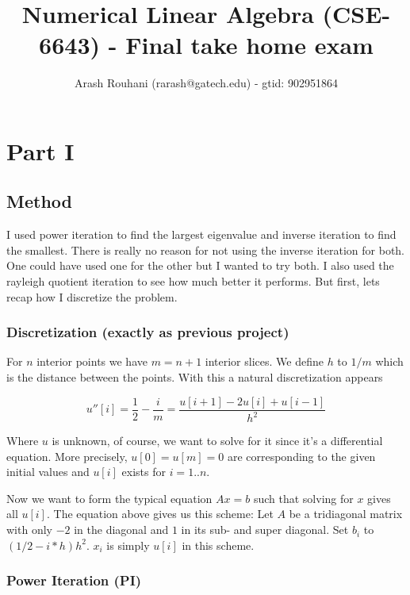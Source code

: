 \documentclass[a4paper,11pt]{article}
\title{Numerical Linear Algebra (CSE-6643) - Final take home exam}
\author{Arash Rouhani (rarash@gatech.edu) - gtid: 902951864}
\begin{document}
\maketitle

\section{Part I}


\subsection{Method}

I used power iteration to find the largest eigenvalue and inverse iteration to
find the smallest. There is really no reason for not using the inverse
iteration for both. One could have used one for the other but I wanted to try
both.  I also used the rayleigh quotient iteration to see how much better it
performs. But first, lets recap how I discretize the problem.

\subsubsection{Discretization (exactly as previous project)}

For $n$ interior points we have $m=n+1$ interior slices. We define $h$
to $1/m$ which is the distance between the points. With this a natural
discretization appears

\[
  u''[i] = \frac{1}{2} - \frac{i}{m} = \frac{u[i+1]-2u[i]+u[i-1]}{h^2}
\]

Where $u$ is unknown, of course, we want to solve for it since it's a
differential equation. More precisely, $u[0]=u[m]=0$ are corresponding
to the given initial values and $u[i]$ exists for $i = 1..n$.

Now we want to form the typical equation $Ax=b$ such that solving for
$x$ gives all $u[i]$. The equation above gives us this scheme: Let $A$
be a tridiagonal matrix with only $-2$ in the diagonal and $1$ in its
sub- and super diagonal. Set $b_i$ to $(1/2-i*h)h^2$. $x_i$ is simply
$u[i]$ in this scheme.


\subsubsection{Power Iteration (PI)}
\end{document}

